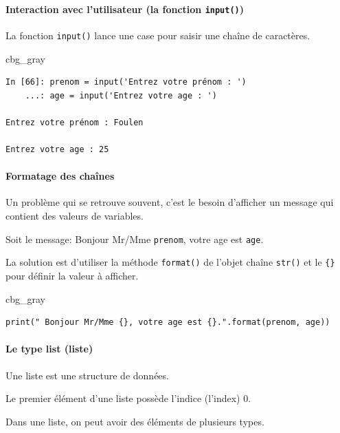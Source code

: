 \documentclass[%
oneside,                 %
final,                   %
10pt]{article}
\newenvironment{_cod_tight}[1]{
   \def\FrameCommand{\colorbox{#1}}
   \FrameRule0.6pt\MakeFramed {\FrameRestore}\vskip3mm}
   {\vskip0mm\endMakeFramed}
\newenvironment{cod}[1]{
\bgroup\rmfamily
\fboxsep=0mm\relax
\begin{_cod_tight}{#1}
\list{}{\parsep=-2mm\parskip=0mm\topsep=0pt\leftmargin=2mm
\rightmargin=2\leftmargin\leftmargin=4pt\relax}
\item\relax}
{\endlist\end{_cod_tight}\egroup}
\begin{document}
\paragraph{Interaction avec l'utilisateur (la fonction \texttt{input()})}

La fonction \texttt{input()} lance une case pour saisir une chaîne de caractères.

\begin{cod}{cbg_gray}\begin{verbatim}
In [66]: prenom = input('Entrez votre prénom : ')
    ...: age = input('Entrez votre age : ')

Entrez votre prénom : Foulen

Entrez votre age : 25
\end{verbatim}
\end{cod}
\noindent

\paragraph{ Formatage des chaînes}

Un problème qui se retrouve souvent, c’est le besoin d’afficher un message qui contient des valeurs de variables.

Soit le message: Bonjour Mr/Mme \texttt{prenom}, votre age est \texttt{age}.

La solution est d'utiliser la méthode \texttt{format()} de l'objet chaîne \texttt{str()} et le \Verb!{}! pour définir la valeur à afficher.

\begin{cod}{cbg_gray}\begin{verbatim}
print(" Bonjour Mr/Mme {}, votre age est {}.".format(prenom, age))
\end{verbatim}
\end{cod}
\noindent


\paragraph{Le type list (liste)}

Une liste est une structure de données.

Le premier élément d'une liste possède l'indice (l'index) 0.

Dans une liste, on peut avoir des éléments de plusieurs types.
\end{document}
